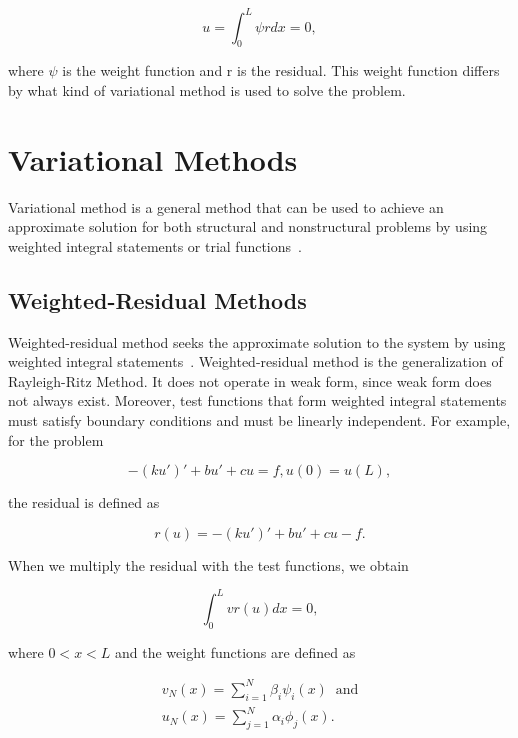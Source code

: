 \begin{equation}
u = \int_{0}^L \psi r dx = 0,
\label{eqn:2-2}
\end{equation}

\noindent where $\psi$ is the weight function and r is the residual. This weight function differs by what kind of variational method is used to solve the problem.

\section{Variational Methods}

Variational method is a general method that can be used to achieve an approximate solution for both structural and nonstructural problems by using weighted integral statements or trial functions~\cite{Logan07}. 

\subsection{Weighted-Residual Methods}

Weighted-residual method seeks the approximate solution to the system by using weighted integral statements~\cite{Reddy02}. Weighted-residual method is the generalization of Rayleigh-Ritz Method. It does not operate in weak form, since weak form does not always exist. Moreover, test functions that form weighted integral statements must satisfy boundary conditions and must be linearly independent. For example, for the problem

\begin{equation}
-(ku')' + bu' + cu = f, u(0)=u(L),
\label{eqn:problem}
\end{equation}

\noindent the residual is defined as

\begin{equation}
r(u) = -(ku')' + bu' + cu - f.
\label{eqn:wrm1}
\end{equation}

\noindent When we multiply the residual with the test functions, we obtain

\begin{equation}
\int_{0}^L  v r(u)dx = 0,
\label{eqn:wrm2}
\end{equation}

\noindent where $0 < x < L$ and the weight functions are defined as

\begin{equation}
\begin{array}{l}
v_{N}(x) = \sum\limits_{i=1}^N \beta_{i}\psi_{i}(x) \;\;\text{and}\\
u_{N}(x) = \sum\limits_{j=1}^N \alpha_{i}\phi_{j}(x).
\end{array}
\label{eqn:wrm4}
\end{equation}

